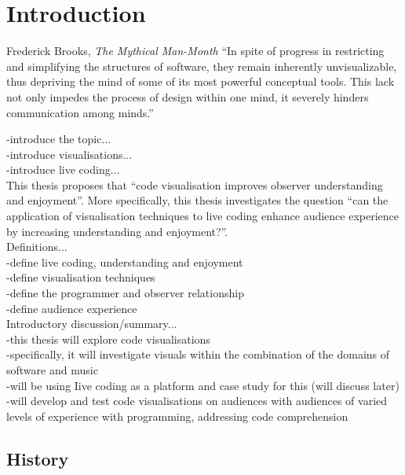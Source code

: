
\chapter{Introduction}
\label{chap:introduction}

\begin{chapquote}{Frederick Brooks, \textit{The Mythical Man-Month}}
``In spite of progress in restricting and simplifying the structures of software, they remain inherently unvisualizable, thus depriving the mind of some of its most powerful conceptual tools. This lack not only impedes the process of design within one mind, it severely hinders communication among minds.''
\end{chapquote}

-introduce the topic...\\
-introduce visualisations...\\
-introduce live coding...\\

This thesis proposes that ``code visualisation improves observer understanding and enjoyment''. More specifically, this thesis investigates the question ``can the application of visualisation techniques to live coding enhance audience experience by increasing understanding and enjoyment?''.\\

Definitions...\\
-define live coding, understanding and enjoyment\\
-define visualisation techniques\\
-define the programmer and observer relationship\\
-define audience experience\\

Introductory discussion/summary...\\
-this thesis will explore code visualisations\\
-specifically, it will investigate visuals within the combination of the domains of software and music\\
-will be using Iive coding as a platform and case study for this (will discuss later)\\
-will develop and test code visualisations on audiences with audiences of varied levels of experience with programming, addressing code comprehension\\

\section{History}

